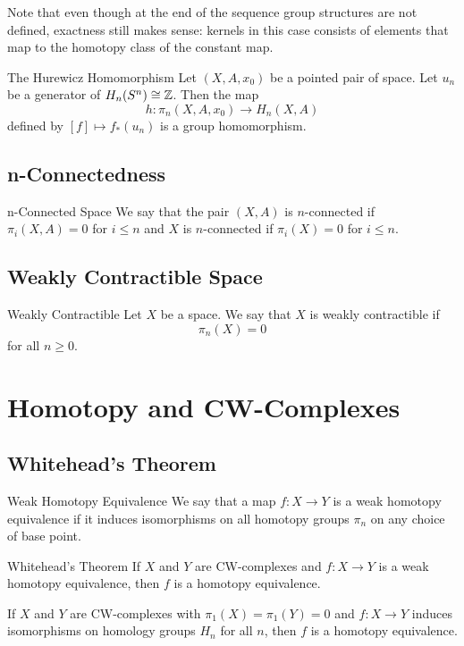 \documentclass[a4paper]{article}
\begin{document}
Note that even though at the end of the sequence group structures are not defined, exactness still makes sense: kernels in this case consists of elements that map to the homotopy class of the constant map. 

\begin{thm}{The Hurewicz Homomorphism}{} Let $(X,A,x_0)$ be a pointed pair of space. Let $u_n$ be a generator of $H_n(S^n)\cong\mathbb{Z}$. Then the map $$h:\pi_n(X,A,x_0)\to H_n(X,A)$$ defined by $[f]\mapsto f_\ast(u_n)$ is a group homomorphism. 
\end{thm}

\subsection{n-Connectedness}
\begin{defn}{n-Connected Space}{} We say that the pair $(X,A)$ is $n$-connected if $\pi_i(X,A)=0$ for $i\leq n$ and $X$ is $n$-connected if $\pi_i(X)=0$ for $i\leq n$. 
\end{defn}

\subsection{Weakly Contractible Space}
\begin{defn}{Weakly Contractible}{} Let $X$ be a space. We say that $X$ is weakly contractible if $$\pi_n(X)=0$$ for all $n\geq 0$. 
\end{defn}

\pagebreak
\section{Homotopy and CW-Complexes}
\subsection{Whitehead's Theorem}
\begin{defn}{Weak Homotopy Equivalence}{} We say that a map $f:X\to Y$ is a weak homotopy equivalence if it induces isomorphisms on all homotopy groups $\pi_n$ on any choice of base point. 
\end{defn}

\begin{thm}{Whitehead's Theorem}{} If $X$ and $Y$ are CW-complexes and $f:X\to Y$ is a weak homotopy equivalence, then $f$ is a homotopy equivalence. 
\end{thm}

\begin{crl}{}{} If $X$ and $Y$ are CW-complexes with $\pi_1(X)=\pi_1(Y)=0$ and $f:X\to Y$ induces isomorphisms on homology groups $H_n$ for all $n$, then $f$ is a homotopy equivalence. 
\end{crl}
\end{document}
